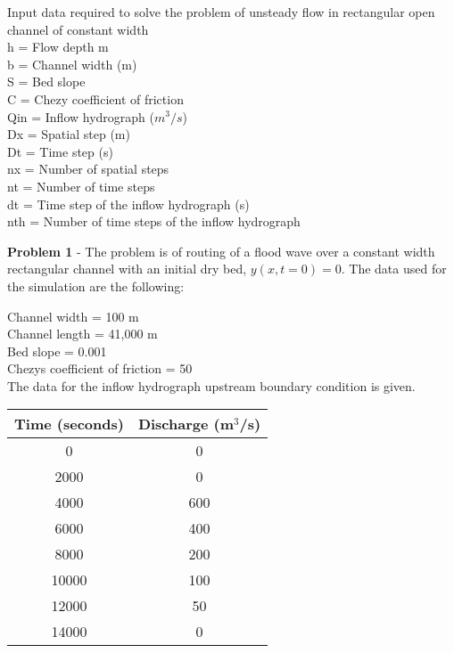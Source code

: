 \documentclass{article}
\begin{document}
Input data required to solve the problem of unsteady flow in rectangular open channel of constant width\\

\noindent
h = Flow depth m\\
b = Channel width (m)\\
S = Bed slope\\
C = Chezy coefficient of friction \\
Qin = Inflow hydrograph (\( m^3/s\))\\
Dx = Spatial step (m)\\
Dt = Time step (s)\\
nx = Number of spatial steps\\
nt = Number of time steps\\
dt = Time step of the inflow hydrograph (s)\\
nth = Number of time steps of the inflow hydrograph\\

\noindent
\begin{tcolorbox}[colback=yellow!30!white, colframe=black, width=\textwidth, boxrule=0.5mm, sharp corners, left=1mm, right=1mm, top=1mm, bottom=1mm]
\textbf{Problem 1}
\noindent 
- The problem is of routing of a flood wave over a constant width rectangular channel with an initial dry bed, \(y(x, t = 0) = 0\).
The data used for the simulation are the following:\\
\end{tcolorbox}

\noindent
 Channel width = 100 m\\
 Channel length = 41,000 m\\
 Bed slope = 0.001\\
 Chezys coefficient of friction = 50\\

The data for the inflow hydrograph upstream boundary condition is given.

\begin{longtable}{|c|c|}
    \hline
    \textbf{Time (seconds)} & \textbf{Discharge (m\(^3\)/s)} \\
    \hline
    \endfirsthead
    
    \hline
    0 & 0 \\
    2000 & 0 \\
    4000 & 600 \\
    6000 & 400 \\
    8000 & 200 \\
    10000 & 100 \\
    12000 & 50 \\
    14000 & 0 \\
    \hline
    
\end{longtable}
\end{document}
